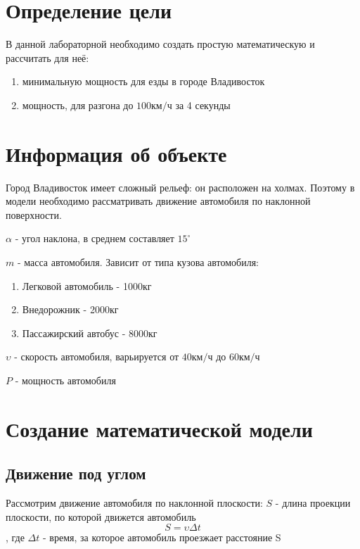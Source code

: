 \documentclass[a4paper, 14pt]{extarticle}
\begin{document}
	\pagebreak	

	\section{Определение цели}
		В данной лабораторной необходимо создать простую математическую и рассчитать для неё:
		\begin{enumerate}[leftmargin=3\parindent, itemsep=0mm]
			\item минимальную мощность для езды в городе Владивосток
			\item мощность, для разгона до \(100 \text{км}/\text{ч} \)  за 4 секунды
		\end{enumerate}

	\section{Информация об объекте}
		Город Владивосток имеет сложный рельеф: он расположен на холмах. Поэтому в модели необходимо рассматривать движение
		автомобиля по наклонной поверхности.
		
		\(\alpha \) - угол наклона, в среднем составляет \( 15 ^\circ \)

		\( m \) - масса автомобиля. Зависит от типа кузова автомобиля:
		\begin{enumerate}[leftmargin=3\parindent, itemsep=0mm]
			\item Легковой автомобиль - 1000кг
			\item Внедорожник - 2000кг
			\item Пассажирский автобус - 8000кг
		\end{enumerate}

		\( \upsilon \) - скорость автомобиля, варьируется от \(40 \text{км}/\text{ч} \) до \(60 \text{км}/\text{ч} \) 
		
		\( P \) - мощность автомобиля

	\section{Создание математической модели}
		\subsection{Движение под углом}
			Рассмотрим движение автомобиля по наклонной плоскости:
			\( S \) - длина проекции плоскости, по которой движется автомобиль
			\[ S = \upsilon \Delta t \tag{3.1.1} \label{eq:special} \]
			, где \( \Delta t \) - время, за которое автомобиль проезжает расстояние S
	
\end{document}
